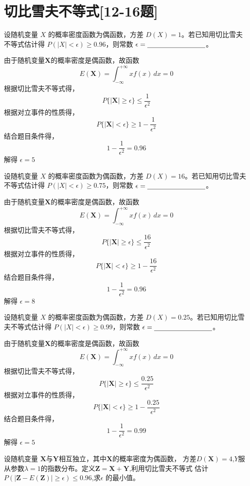 \section*{切比雪夫不等式[12-16题]}
\begin{question}
    设随机变量 $X$ 的概率密度函数为偶函数，方差 $D(X) = 1$。若已知用切比雪夫不等式估计得 $P(|X| < \epsilon) \geq 0.96$，则常数 $\epsilon = \rule[-0.5ex]{3cm}{0.4pt}$。
\end{question}
\begin{solution}
    由于随机变量\(\bm{X}\)的概率密度是偶函数，故函数\[E(\bm{X}) = \int_{-\infty}^{+\infty} xf(x) \,dx = 0\]
    根据切比雪夫不等式得，\[P\{\vert \bm{X}  \vert \geq \epsilon\} \leq \frac{1}{\epsilon^2}\]
    根据对立事件的性质得，\[P\{\vert \bm{X}  \vert < \epsilon\} \geq 1-\frac{1}{\epsilon^2}\]
    结合题目条件得，\[1-\frac{1}{\epsilon^2} = 0.96\]
    解得 \(\epsilon  = 5\)
\end{solution}
\begin{question}
    设随机变量 $X$ 的概率密度函数为偶函数，方差 $D(X) = 16$。若已知用切比雪夫不等式估计得 $P(|X| < \epsilon) \geq 0.75$，则常数 $\epsilon = \rule[-0.5ex]{3cm}{0.4pt}$。
\end{question}
\begin{solution}
    由于随机变量\(\bm{X}\)的概率密度是偶函数，故函数\[E(\bm{X}) = \int_{-\infty}^{+\infty} xf(x) \,dx = 0\]
    根据切比雪夫不等式得，\[P\{\vert \bm{X}  \vert \geq \epsilon\} \leq \frac{16}{\epsilon^2}\]
    根据对立事件的性质得，\[P\{\vert \bm{X}  \vert < \epsilon\} \geq 1-\frac{16}{\epsilon^2}\]
    结合题目条件得，\[1-\frac{1}{\epsilon^2} = 0.96\]
    解得 \(\epsilon  = 8\)
\end{solution}
\begin{question}
    设随机变量 $X$ 的概率密度函数为偶函数，方差 $D(X) = 0.25$。若已知用切比雪夫不等式估计得 $P(|X| < \epsilon) \geq 0.99$，则常数 $\epsilon = \rule[-0.5ex]{3cm}{0.4pt}$。
\end{question}
\begin{solution}
    由于随机变量\(\bm{X}\)的概率密度是偶函数，故函数\[E(\bm{X}) = \int_{-\infty}^{+\infty} xf(x) \,dx = 0\]
    根据切比雪夫不等式得，\[P\{\vert \bm{X}  \vert \geq \epsilon\} \leq \frac{0.25}{\epsilon^2}\]
    根据对立事件的性质得，\[P\{\vert \bm{X}  \vert < \epsilon\} \geq 1-\frac{0.25}{\epsilon^2}\]
    结合题目条件得，\[1-\frac{1}{\epsilon^2} = 0.99\]
    解得 \(\epsilon  = 5\)
\end{solution}
\begin{question}
    设随机变量 \(\bm{X}\)与\(\bm{Y}\)相互独立，其中\(\bm{X}\)的概率密度为偶函数，
    方差\(D(\bm{X}) = 4\),\(Y\)服从参数\(\lambda =1\)的指数分布。定义\(\bm{Z} = \bm{X}+\bm{Y}\),利用切比雪夫不等式
    估计\(P(\vert \bm{Z}-E(\bm{Z})\vert \geq \epsilon) \leq 0.96\),求\(\epsilon\)
    的最小值。
\end{question}
